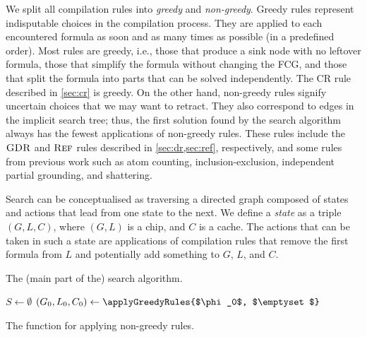 We split all compilation rules into \emph{greedy} and \emph{non-greedy}. Greedy
rules represent indisputable choices in the compilation process. They are
applied to each encountered formula as soon and as many times as possible (in a
predefined order). Most rules are greedy, i.e., those that produce a sink node
with no leftover formula, those that simplify the formula without changing the
FCG, and those that split the formula into parts that can be solved
independently. The CR rule described in \cref{sec:cr} is greedy. On the other
hand, non-greedy rules signify uncertain choices that we may want to retract.
They also correspond to edges in the implicit search tree; thus, the first
solution found by the search algorithm always has the fewest applications of
non-greedy rules. These rules include the $\operatorname{\textsc{GDR}}$ and $\operatorname{\textsc{Ref}}$ rules described in
\cref{sec:dr,sec:ref}, respectively, and some rules from previous work
\citep{DBLP:conf/ijcai/BroeckTMDR11} such as atom counting, inclusion-exclusion,
independent partial grounding, and shattering.

Search can be conceptualised as traversing a directed graph composed of states
and actions that lead from one state to the next. We define a \emph{state} as a
triple $(G, L, C)$, where $(G, L)$ is a chip, and $C$ is a cache. The actions
that can be taken in such a state are applications of compilation rules that
remove the first formula from $L$ and potentially add something to $G$, $L$, and
$C$.

\begin{algorithm}[t]
  \caption{The (main part of the) search algorithm.}\label{alg:search}
   $S \gets \emptyset$\;
  $(G_0, L_0, C_{0}) \gets \applyGreedyRules{$\phi_0$, $\emptyset$}$\;\label{line:greedy}
\end{algorithm}

\begin{algorithm}[t]
  \caption{The function for applying non-greedy rules.}\label{alg:applyallrules}
\end{algorithm}

